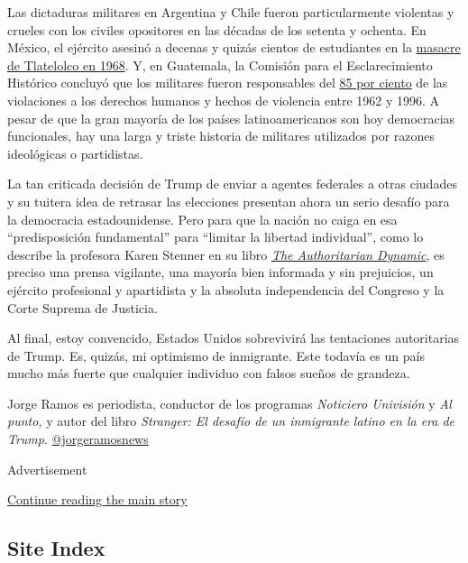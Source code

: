 Las dictaduras militares en Argentina y Chile fueron particularmente
violentas y crueles con los civiles opositores en las décadas de los
setenta y ochenta. En México, el ejército asesinó a decenas y quizás
cientos de estudiantes en la
\href{https://www.nytimes.com/es/2018/09/30/espanol/opinion/opinion-enrique-krauze-tlatelolco-68.html}{masacre
de Tlatelolco en 1968}. Y, en Guatemala, la Comisión para el
Esclarecimiento Histórico concluyó que los militares fueron responsables
del
\href{http://www.centrodememoriahistorica.gov.co/descargas/guatemala-memoria-silencio/guatemala-memoria-del-silencio.pdf}{85
por ciento} de las violaciones a los derechos humanos y hechos de
violencia entre 1962 y 1996. A pesar de que la gran mayoría de los
países latinoamericanos son hoy democracias funcionales, hay una larga y
triste historia de militares utilizados por razones ideológicas o
partidistas.

La tan criticada decisión de Trump de enviar a agentes federales a otras
ciudades y su tuitera idea de retrasar las elecciones presentan ahora un
serio desafío para la democracia estadounidense. Pero para que la nación
no caiga en esa ``predisposición fundamental'' para ``limitar la
libertad individual'', como lo describe la profesora Karen Stenner en su
libro
\href{https://www.cambridge.org/core/books/authoritarian-dynamic/7620B99124ED2DBFC6394444838F455A}{\emph{The
Authoritarian Dynamic}}, es preciso una prensa vigilante, una mayoría
bien informada y sin prejuicios, un ejército profesional y apartidista y
la absoluta independencia del Congreso y la Corte Suprema de Justicia.

Al final, estoy convencido, Estados Unidos sobrevivirá las tentaciones
autoritarias de Trump. Es, quizás, mi optimismo de inmigrante. Este
todavía es un país mucho más fuerte que cualquier individuo con falsos
sueños de grandeza.

Jorge Ramos es periodista, conductor de los programas \emph{Noticiero
Univisión} y \emph{Al punto,} y autor del libro \emph{Stranger: El
desafío de un inmigrante latino en la era de Trump}.
\href{https://twitter.com/jorgeramosnews}{@jorgeramosnews}

Advertisement

\protect\hyperlink{after-bottom}{Continue reading the main story}

\hypertarget{site-index}{%
\subsection{Site Index}\label{site-index}}

